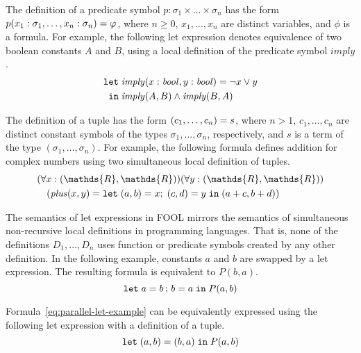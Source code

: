 \documentclass{easychair}
\begin{document}
The definition of a predicate symbol $p:\sigma_1\times\ldots\times\sigma_n$ has 
the form ${p(x_1:\sigma_1,\ldots,x_n:\sigma_n)}={\varphi}$, where 
$n \geq 0$, $x_1,\ldots,x_n$ are distinct variables, and $\phi$ is a formula.
For example, the following let expression denotes equivalence of two boolean 
constants $A$ and $B$, using a local definition of the predicate symbol 
$\mathit{imply}$.
\begin{equation}\label{eq:fool-let-imply2}
\begin{aligned}
\mathtt{let}\;&{\mathit{imply}(x:\mathit{bool},y:\mathit{bool})}={\neg x \lor y}\\
 \mathtt{in}\;&\mathit{imply}(A,B)\wedge\mathit{imply}(B,A)
\end{aligned}
\end{equation}

The definition of a tuple has the form ${(c_1,\ldots,c_n)}={s}$, where
$n > 1$, $c_1,\ldots,c_n$ are distinct constant symbols of the types
$\sigma_1,\ldots,\sigma_n$, respectively, and $s$ is a term of the type
$(\sigma_1,\ldots,\sigma_n)$. 
For example, the following formula defines addition for complex numbers using 
two simultaneous local definition of tuples.
\begin{equation}\label{eq:fool-tuple-let}
  \begin{aligned}
  &(\forall x:(\mathds{R},\mathds{R}))(\forall y:(\mathds{R},\mathds{R}))\\
  &\quad(\mathit{plus}(x,y) = \letinpar{(a,b)}{x}{(c,d)}{y}{\tuple{a+c,b+d})}
  \end{aligned}
\end{equation}

The semantics of let expressions in FOOL mirrors the semantics of
simultaneous non-recursive local definitions in programming languages. 
That is, none of the definitions $D_1,\ldots,\allowbreak D_n$ uses function or
predicate symbols created by any other definition. 
In the following example, constants $a$ and $b$ are swapped by a let 
expression. 
The resulting formula is equivalent to $P(b, a)$.
\begin{equation}\label{eq:parallel-let-example}
\mathtt{let}\;{a}={b}\,;\,{b}={a}\;\mathtt{in}\;P(a, b)
\end{equation}

Formula~\ref{eq:parallel-let-example} can be equivalently expressed using 
the following let expression with a definition of a tuple.
\begin{equation}\label{eq:parallel-let-tuple-example}
\mathtt{let}\;{(a,b)}={(b,a)}\;\mathtt{in}\;P(a, b)
\end{equation}
\end{document}
